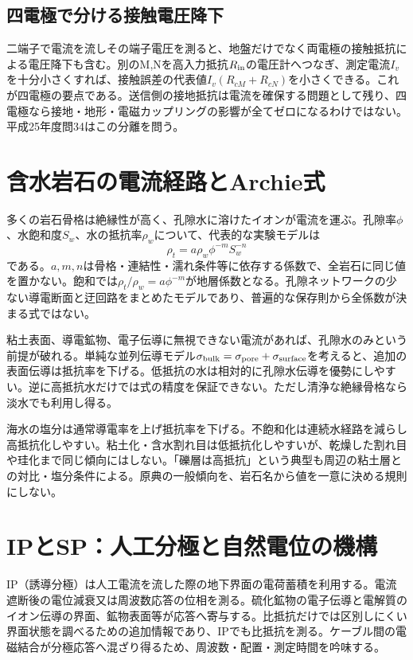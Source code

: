 \subsection*{四電極で分ける接触電圧降下}
\label{theory:exploration:fourpoint}
二端子で電流を流しその端子電圧を測ると、地盤だけでなく両電極の接触抵抗による電圧降下も含む。別のM,Nを高入力抵抗\(R_{\rm in}\)の電圧計へつなぎ、測定電流\(I_v\)を十分小さくすれば、接触誤差の代表値\(I_v(R_{cM}+R_{cN})\)を小さくできる。これが四電極の要点である。送信側の接地抵抗は電流を確保する問題として残り、四電極なら接地・地形・電磁カップリングの影響が全てゼロになるわけではない。平成25年度問34はこの分離を問う。

\section{含水岩石の電流経路とArchie式}
\label{theory:exploration:archie}
多くの岩石骨格は絶縁性が高く、孔隙水に溶けたイオンが電流を運ぶ。孔隙率\(\phi\)、水飽和度\(S_w\)、水の抵抗率\(\rho_w\)について、代表的な実験モデルは
\[
 \rho_t=a\rho_w\phi^{-m}S_w^{-n}
\]
である。\(a,m,n\)は骨格・連結性・濡れ条件等に依存する係数で、全岩石に同じ値を置かない。飽和では\(\rho_t/\rho_w=a\phi^{-m}\)が地層係数となる。孔隙ネットワークの少ない導電断面と迂回路をまとめたモデルであり、普遍的な保存則から全係数が決まる式ではない。

粘土表面、導電鉱物、電子伝導に無視できない電流があれば、孔隙水のみという前提が破れる。単純な並列伝導モデル\(\sigma_{\rm bulk}=\sigma_{\rm pore}+\sigma_{\rm surface}\)を考えると、追加の表面伝導は抵抗率を下げる。低抵抗の水は相対的に孔隙水伝導を優勢にしやすい。逆に高抵抗水だけでは式の精度を保証できない。ただし清浄な絶縁骨格なら淡水でも利用し得る\cite{epa_borehole_resistivity}。

海水の塩分は通常導電率を上げ抵抗率を下げる。不飽和化は連続水経路を減らし高抵抗化しやすい。粘土化・含水割れ目は低抵抗化しやすいが、乾燥した割れ目や珪化まで同じ傾向にはしない。「礫層は高抵抗」という典型も周辺の粘土層との対比・塩分条件による。原典の一般傾向を、岩石名から値を一意に決める規則にしない。

\section{IPとSP：人工分極と自然電位の機構}
\label{theory:exploration:ipsp}
IP（誘導分極）は人工電流を流した際の地下界面の電荷蓄積を利用する。電流遮断後の電位減衰又は周波数応答の位相を測る。硫化鉱物の電子伝導と電解質のイオン伝導の界面、鉱物表面等が応答へ寄与する。比抵抗だけでは区別しにくい界面状態を調べるための追加情報であり、IPでも比抵抗を測る。ケーブル間の電磁結合が分極応答へ混ざり得るため、周波数・配置・測定時間を吟味する\cite{epa_ip}。

